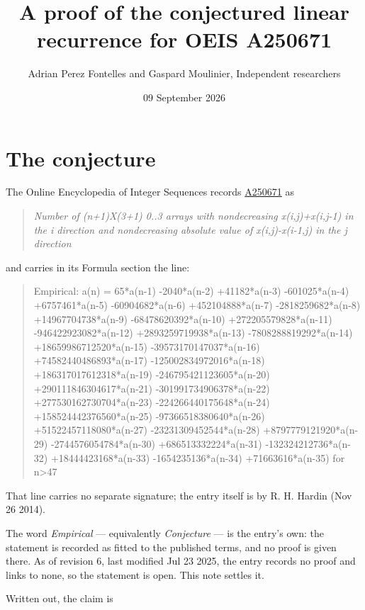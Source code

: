 \documentclass[11pt]{article}
\title{A proof of the conjectured linear recurrence for OEIS A250671}
\author{Adrian Perez Fontelles and Gaspard Moulinier, Independent researchers}
\date{09 September 2026}
\theoremstyle{definition}
\begin{document}
\maketitle
\section{The conjecture}

The Online Encyclopedia of Integer Sequences records \href{https://oeis.org/A250671}{A250671} as

\begin{quote}\itshape Number of (n+1)X(3+1) 0..3 arrays with nondecreasing x(i,j)+x(i,j-1) in the i direction and nondecreasing absolute value of x(i,j)-x(i-1,j) in the j direction\end{quote}

and carries in its Formula section the line:

\begin{quote}\ttfamily Empirical: a(n) = 65*a(n-1) -2040*a(n-2) +41182*a(n-3) -601025*a(n-4) +6757461*a(n-5) -60904682*a(n-6) +452104888*a(n-7) -2818259682*a(n-8) +14967704738*a(n-9) -68478620392*a(n-10) +272205579828*a(n-11) -946422923082*a(n-12) +2893259719938*a(n-13) -7808288819292*a(n-14) +18659986712520*a(n-15) -39573170147037*a(n-16) +74582440486893*a(n-17) -125002834972016*a(n-18) +186317017612318*a(n-19) -246795421123605*a(n-20) +290111846304617*a(n-21) -301991734906378*a(n-22) +277530162730704*a(n-23) -224266440175648*a(n-24) +158524442376560*a(n-25) -97366518380640*a(n-26) +51522457118080*a(n-27) -23231309452544*a(n-28) +8797779121920*a(n-29) -2744576054784*a(n-30) +686513332224*a(n-31) -132324212736*a(n-32) +18444423168*a(n-33) -1654235136*a(n-34) +71663616*a(n-35) for n>47\end{quote}

That line carries no separate signature; the entry itself is by R. H. Hardin (Nov 26 2014).

The word {\itshape Empirical} --- equivalently {\itshape Conjecture} --- is the entry's own: the statement is recorded as fitted to the published terms, and no proof is given there. As of revision 6, last modified Jul 23 2025, the entry records no proof and links to none, so the statement is open. This note settles it.

Written out, the claim is
\end{document}
